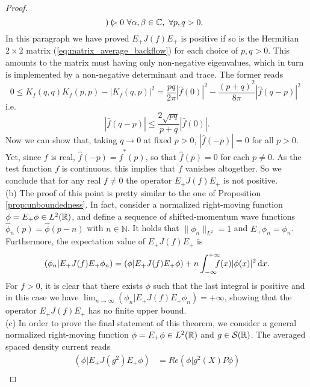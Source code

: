 \begin{proof}
\begin{equation}
\begin{pmatrix}
	\end{pmatrix}>0\  \forall \alpha,\beta\in{\mathbb C},\ \forall p,q>0.
	\label{eq:matrix_average_backflow}
	\end{equation}
	In this paragraph we have proved $E_+J(f)E_+$ is positive if so is the Hermitian $2\times2$ matrix (\ref{eq:matrix_average_backflow}) for each choice of $p,q>0$. This amounts to the matrix must having only non-negative eigenvalues, which in turn is implemented by a non-negative determinant and trace. The former reads
	\begin{equation}
	0\le K_f(q,q)K_f(p,p)-|K_f(q,p)|^2=\frac{pq}{2\pi}|\hat{f}(0)|^2-\frac{(p+q)^2}{8\pi}|\hat{f}(q-p)|^2\, \
	\end{equation}
	i.e. 
	\begin{equation}
	|\hat{f}(q-p)|\le\frac{2\sqrt{pq}}{p+q}|\hat{f}(0)|.
	\end{equation}
	Now we can show that, taking $q\to0$ at fixed $p>0$, $|\hat{f}(-p)|=0$ for all $p>0$. Yet, since $f$ is real, $\hat{f}(-p)=\hat{f}^*(p)$, so that $\hat{f}(p)=0$ for each $p\neq0$. As the test function $f$ is continuous, this implies that $f$ vanishes altogether. So we conclude that for any real $f\neq0$ the operator $E_+J(f)E_+$ is not positive.\\
	(b) The proof of this point is pretty similar to the one of Proposition \ref{prop:unboundedness}. In fact, consider a normalized right-moving function $\phi=E_+\phi \in L^2({\mathbb R})$, and define a sequence of shifted-momentum wave functions $\hat{\phi}_n(p)=\hat{\phi}(p-n)$ with $n\in\mathbb{N}$. It holds that $\|\phi_n\|_{L^2}=1$ and $E_+\phi_n=\phi_n$. Furthermore, the expectation value of $E_+J(f)E_+$ is
	\begin{equation}
	(\phi_n|E_+J(f)E_+\phi_n)=(\phi|E_+J(f)E_+\phi)+n\int_{-\infty}^{+\infty}\!\!\!\!\! f(x)|\phi(x)|^2\, \mathrm d x.
	\end{equation} 
	For $f>0$, it is clear that there exists $\phi$ such that the last integral is positive and in this case we have $\lim_{n\to\infty}(\phi_n|E_+J(f)E_+\phi_n)=+\infty$, showing that the operator $E_+J(f)E_+$ has no finite upper bound.\\
	(c) In order to prove the final statement of this theorem, we consider a general normalized right-moving function $\phi=E_+\phi\in L^2({\mathbb R})$ and $g\in\mathcal{S}({\mathbb R})$. The averaged spaced density current reads
	\begin{equation}
	\begin{aligned}
	(\phi|E_+J(g^2)E_+\phi)& = Re(\phi|g^2(X)P\phi)\\

\end{aligned}
\end{equation}
\end{proof}
